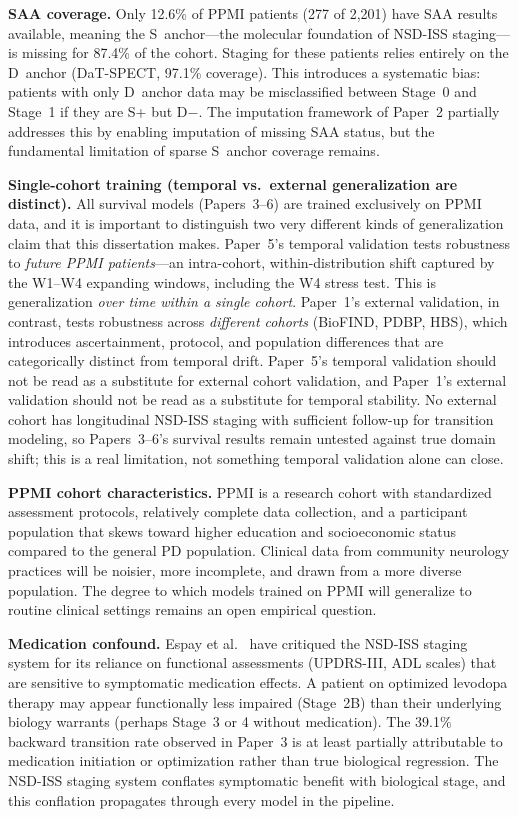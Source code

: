 \textbf{SAA coverage.} Only 12.6\% of PPMI patients (277 of 2,201) have SAA results available, meaning the S~anchor---the molecular foundation of NSD-ISS staging---is missing for 87.4\% of the cohort. Staging for these patients relies entirely on the D~anchor (DaT-SPECT, 97.1\% coverage). This introduces a systematic bias: patients with only D~anchor data may be misclassified between Stage~0 and Stage~1 if they are S+ but D$-$. The imputation framework of Paper~2 partially addresses this by enabling imputation of missing SAA status, but the fundamental limitation of sparse S~anchor coverage remains.

\textbf{Single-cohort training (temporal vs.\ external generalization are distinct).} All survival models (Papers~3--6) are trained exclusively on PPMI data, and it is important to distinguish two very different kinds of generalization claim that this dissertation makes. Paper~5's temporal validation tests robustness to \emph{future PPMI patients}---an intra-cohort, within-distribution shift captured by the W1--W4 expanding windows, including the W4 stress test. This is generalization \emph{over time within a single cohort}. Paper~1's external validation, in contrast, tests robustness across \emph{different cohorts} (BioFIND, PDBP, HBS), which introduces ascertainment, protocol, and population differences that are categorically distinct from temporal drift. Paper~5's temporal validation should not be read as a substitute for external cohort validation, and Paper~1's external validation should not be read as a substitute for temporal stability. No external cohort has longitudinal NSD-ISS staging with sufficient follow-up for transition modeling, so Papers~3--6's survival results remain untested against true domain shift; this is a real limitation, not something temporal validation alone can close.

\textbf{PPMI cohort characteristics.} PPMI is a research cohort with standardized assessment protocols, relatively complete data collection, and a participant population that skews toward higher education and socioeconomic status compared to the general PD population. Clinical data from community neurology practices will be noisier, more incomplete, and drawn from a more diverse population. The degree to which models trained on PPMI will generalize to routine clinical settings remains an open empirical question.

\textbf{Medication confound.} Espay et al.~\cite{espay2025} have critiqued the NSD-ISS staging system for its reliance on functional assessments (UPDRS-III, ADL scales) that are sensitive to symptomatic medication effects. A patient on optimized levodopa therapy may appear functionally less impaired (Stage~2B) than their underlying biology warrants (perhaps Stage~3 or 4 without medication). The 39.1\% backward transition rate observed in Paper~3 is at least partially attributable to medication initiation or optimization rather than true biological regression. The NSD-ISS staging system conflates symptomatic benefit with biological stage, and this conflation propagates through every model in the pipeline.

